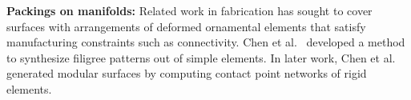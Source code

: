 \textbf{Packings on manifolds:}
Related work in fabrication has sought to cover surfaces with
arrangements of deformed ornamental elements that satisfy manufacturing
constraints such as connectivity.  Chen et al.~\cite{Chen2016}
developed a method to synthesize filigree patterns out of simple
elements. 
In later work, Chen et al.~\cite{Chen2017}
generated modular surfaces by computing 
contact point networks of rigid elements.





